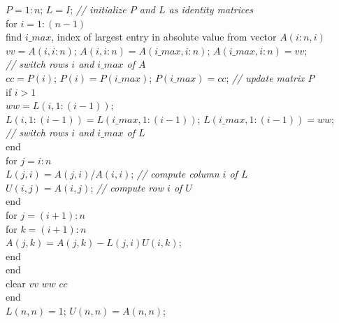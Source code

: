 \begin{table}[H]
{\begin{minipage}{0.9\linewidth}
\noindent
$P = 1:n$; $L = I$; \hfill\textit{// initialize $P$ and $L$ as identity matrices}\\
for $i = 1:(n-1)$\\
\hspace*{1.5em}find $i\_max$, index of largest entry in absolute value from vector $A(i:n,i)$\\
\hspace*{1.5em}$vv = A(i,i:n)$; $A(i,i:n) = A(i\_max,i:n)$; $A(i\_max,i:n) = vv$;\\
\hfill\textit{// switch rows $i$ and $i\_max$ of $A$}\\
\hspace*{1.5em}$cc = P(i)$; $P(i) = P(i\_max)$; $P(i\_max) = cc$; \hfill\textit{// update matrix $P$}\\
\hspace*{1.5em}if $i>1$\\
\hspace*{3em}$ww = L(i,1:(i-1))$;\\
\hspace*{3em}$L(i,1:(i-1)) = L(i\_max,1:(i-1))$; $L(i\_max,1:(i-1)) = ww$;\\
\hfill\textit{// switch rows $i$ and $i\_max$ of $L$}\\
\hspace*{1.5em}end\\
\hspace*{1.5em}for $j = i:n$\\
\hspace*{3em}$L(j,i) = A(j,i)/A(i,i)$; \hfill\textit{// compute column $i$ of $L$}\\
\hspace*{3em}$U(i,j) = A(i,j)$; \hfill\textit{// compute row $i$ of $U$}\\
\hspace*{1.5em}end\\
\hspace*{1.5em}for $j = (i+1):n$\\
\hspace*{3em}for $k = (i+1):n$\\
\hspace*{4.5em}$A(j,k) = A(j,k) - L(j,i)U(i,k)$;\\
\hspace*{3em}end\\
\hspace*{1.5em}end\\
\hspace*{1.5em}clear $vv$ $ww$ $cc$\\
end\\
$L(n,n) = 1$; $U(n,n) = A(n,n)$;
\end{minipage}}
\end{table}

